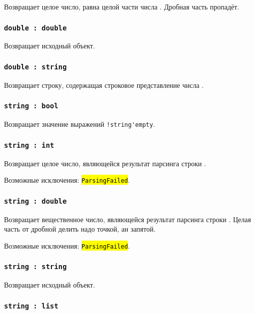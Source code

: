 \documentclass[a4paper, 14pt]{extarticle}
\newcommand{\ferror}[1]{\foreignlanguage{english}{\fontsize{11pt}{12pt}\tt{\sethlcolor{yellow}\hl{#1}}}}
\begin{document}
Возвращает целое число, равна целой части числа \double. Дробная часть пропадёт.

\subsubsection{\lstinline|double : double|}

Возвращает исходный объект.

\subsubsection{\lstinline|double : string|}

Возвращает строку, содержащая строковое представление числа \double.

\subsubsection{\lstinline|string : bool|}

Возвращает значение выражений \lstinline|!string'empty|.

\subsubsection{\lstinline|string : int|}

Возвращает целое число, являющейся результат парсинга строки \str.

Возможные исключения: \ferror{ParsingFailed}.

\subsubsection{\lstinline|string : double|}

Возвращает вещественное число, являющейся результат парсинга строки \str. Целая часть от дробной делить надо точкой, ан запятой.

Возможные исключения: \ferror{ParsingFailed}.

\subsubsection{\lstinline|string : string|}

Возвращает исходный объект.

\subsubsection{\lstinline|string : list|}
\end{document}
